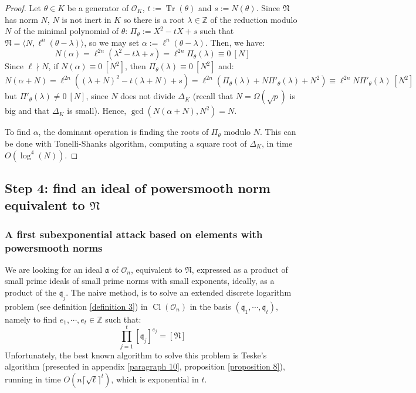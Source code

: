 \documentclass[a4paper,10pt]{report}
\theoremstyle{definition}
\theoremstyle{plain}
\theoremstyle{definition}
\newcommand{\Z}{\mathbb{Z}}
\newcommand{\mO}{\mathcal{O}}
\renewcommand{\(}{\left(}
\renewcommand{\)}{\right)}
\newcommand{\mf}[1]{\mathfrak{#1}}
\DeclareMathOperator{\Tr}{Tr}
\DeclareMathOperator{\Cl}{Cl}
\begin{document}
\begin{proof}
Let $\theta\in K$ be a generator of $\mO_K$, $t:=\Tr(\theta)$ and $s:=N(\theta)$. Since $\mf{N}$ has norm $N$, $N$ is not inert in $K$ so there is a root $\lambda\in\Z$ of the reduction modulo $N$ of the minimal polynomial of $\theta$: $\Pi_\theta:=X^2-tX+s$ such that $\mf{N}=\langle N,\ell^n(\theta-\lambda)\rangle$, so we may set $\alpha:=\ell^n(\theta-\lambda)$. Then, we have:
\[N(\alpha)=\ell^{2n}(\lambda^2-t\lambda+s)=\ell^{2n}\Pi_\theta(\lambda)\equiv 0 \ [N]\]
Since $\ell\nmid N$, if $N(\alpha)\equiv 0 \ [N^2]$, then $\Pi_\theta(\lambda)\equiv 0 \ [N^2]$ and:
\[N(\alpha+N)=\ell^{2n}((\lambda+N)^2-t(\lambda+N)+s)=\ell^{2n}(\Pi_\theta(\lambda)+N\Pi'_\theta(\lambda)+N^2)\equiv \ell^{2n}N\Pi'_\theta(\lambda) \ [N^2]\]
but $\Pi'_\theta(\lambda)\neq 0 \ [N]$, since $N$ does not divide $\Delta_K$ (recall that $N=\Omega(\sqrt{p})$ is big and that $\Delta_K$ is small). Hence, $\gcd(N(\alpha+N),N^2)=N$.  

To find $\alpha$, the dominant operation is finding the roots of $\Pi_\theta$ modulo $N$.  This can be done with Tonelli-Shanks \cite[algorithm 1.5.1]{Cohen1} algorithm, computing a square root of $\Delta_K$, in time $O(\log^4(N))$.
\end{proof}

\subsection{Step 4: find an ideal of powersmooth norm equivalent to $\mf{N}$}

\subsubsection{A first subexponential attack based on elements with powersmooth norms}

We are looking for an ideal $\mf{a}$ of $\mO_n$, equivalent to $\mf{N}$, expressed as a product of small prime ideals of small prime norms with small exponents, ideally, as a product of the $\mf{q}_j$.  The naive method, is to solve an extended discrete logarithm problem (see definition \ref{definition 3}) in $\Cl(\mO_n)$ in the basis $(\mf{q}_1, \cdots, \mf{q}_t)$, namely to find $e_1, \cdots, e_t\in\Z$ such that:
\[\prod_{j=1}^t[\mf{q}_j]^{e_j}=[\mf{N}]\]
Unfortunately, the best known algorithm to solve this problem is Teske's algorithm \cite{Teske} (presented in appendix \ref{paragraph 10}, proposition \ref{proposition 8}), running in time $O\(n\lceil \sqrt{\ell}\rceil^t\)$, which is exponential in $t$.
\end{document}
